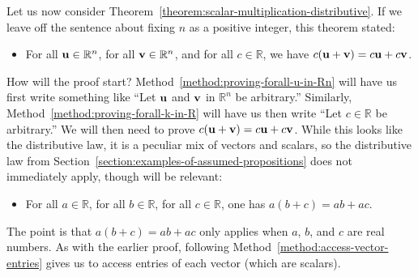 \documentclass{book}
\theoremstyle{ekimcustom}
\begin{document}
Let us now consider Theorem~\ref{theorem:scalar-multiplication-distributive}. If we leave off the sentence about fixing $n$ as a positive integer, this theorem stated:
\begin{itemize}
\item For all ${\bf u} \in \mathbb{R}^n$, for all ${\bf v} \in \mathbb{R}^n$, and for all $c \in \mathbb{R}$, we have $c({\bf u}+{\bf v}) = c{\bf u} + c{\bf v}$.
\end{itemize}
How will the proof start? Method~\ref{method:proving-forall-u-in-Rn} will have us first write something like ``Let ${\bf u}$ and ${\bf v}$ in $\mathbb{R}^n$ be arbitrary.'' Similarly, Method~\ref{method:proving-forall-k-in-R} will have us then write ``Let $c \in \mathbb{R}$ be arbitrary.'' We will then need to prove $c({\bf u}+{\bf v}) = c{\bf u} + c{\bf v}$. While this looks like the distributive law, it is a peculiar mix of vectors and scalars, so the distributive law from Section~\ref{section:examples-of-assumed-propositions} does not immediately apply, though will be relevant:
\begin{itemize}
\item For all $a \in \mathbb{R}$, for all $b \in \mathbb{R}$, for all $c \in \mathbb{R}$, one has $a(b+c)=ab+ac$.
\end{itemize}
The point is that $a(b+c)=ab+ac$ only applies when $a$, $b$, and $c$ are real numbers. As with the earlier proof, following Method~\ref{method:access-vector-entries} gives us to access entries of each vector (which are scalars).
\end{document}
